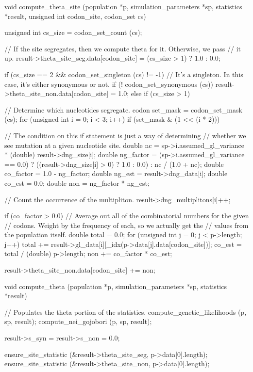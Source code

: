 \documentclass{article}
\begin{document}
\begin{ccode}
void compute_theta_site (population *p, simulation_parameters *sp, statistics *result,
			 unsigned int codon_site, codon_set cs) {
    unsigned int cs_size = codon_set_count (cs);

    // If the site segregates, then we compute theta for it. Otherwise, we pass
    // it up.
    result->theta_site_seg.data[codon_site] = (cs_size > 1) ? 1.0 : 0.0;

    if (cs_size == 2 && codon_set_singleton (cs) != -1) {
      // It's a singleton. In this case, it's either synonymous or not.
      if (! codon_set_synonymous (cs))
	result->theta_site_non.data[codon_site] = 1.0;
    } else if (cs_size > 1) {
      // Determine which nucleotides segregate.
      codon set_mask = codon_set_mask (cs);
      for (unsigned int i = 0; i < 3; i++)
	if (set_mask & (1 << (i * 2))) {
	  // The condition on this if statement is just a way of determining
	  // whether we see mutation at a given nucleotide site.
	  double nc        = sp->i.assumed_gl_variance * (double) result->dng_size[i];
	  double ng_factor = (sp->i.assumed_gl_variance == 0.0) ?
			       ((result->dng_size[i] > 0) ? 1.0 : 0.0) :
			       nc / (1.0 + nc);
	  double co_factor = 1.0 - ng_factor;
	  double ng_est    = result->dng_data[i];
	  double co_est    = 0.0;
	  double non       = ng_factor * ng_est;

	  // Count the occurrence of the multipliton.
	  result->dng_multiplitons[i]++;

	  if (co_factor > 0.0) {
	    // Average out all of the combinatorial numbers for the given
	    // codons. Weight by the frequency of each, so we actually get the
	    // values from the population itself.
	    double total = 0.0;
	    for (unsigned int j = 0; j < p->length; j++)
	      total += result->gl_data[i][_idx(p->data[j].data[codon_site])];
	    co_est = total / (double) p->length;
	    non += co_factor * co_est;
	  }

	  result->theta_site_non.data[codon_site] += non;
	}
    }

}

void compute_theta (population *p, simulation_parameters *sp, statistics *result) {
  // Populates the theta portion of the statistics.
  compute_genetic_likelihoods (p, sp, result);
  compute_nei_gojobori (p, sp, result);
  
  result->s_syn = result->s_non = 0.0;

  ensure_site_statistic (&result->theta_site_seg, p->data[0].length);
  ensure_site_statistic (&result->theta_site_non, p->data[0].length);

}
\end{ccode}
\end{document}
